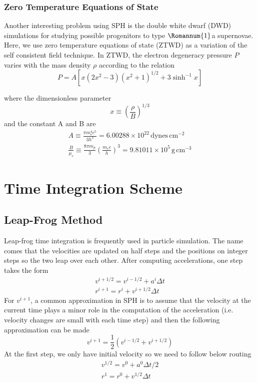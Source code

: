 \documentclass{article}
\begin{document}
\subsubsection{Zero Temperature Equations of State}
Another interesting problem using SPH is the double white dwarf (DWD) simulations for studying possible progenitors to type $\Romannum{1}$a supernovae. Here, we use zero temperature equations of state (ZTWD) as a variation of the self consistent field technique. In ZTWD, the electron degeneracy pressure $P$ varies with the mass density $\rho$ according to the relation
\begin{equation}
P = A \left[ x(2x^2-3)(x^2+1)^{1/2} + 3 \sinh^{-1} x \right]
\end{equation}

where the dimensionless parameter
\begin{equation}
x \equiv \left( \frac{\rho}{B} \right)^{1/3}
\end{equation}
and the constant A and B are
\begin{align}
A \equiv \frac{\pi m_e^4 c^5}{3h^3} = 6.00288 \times 10^{22} \, \text{dynes} \, \text{cm}^{-2} \\
\frac{B}{\mu_e} \equiv \frac{8 \pi m_p}{3} \left(\frac{m_e c}{h} \right)^3 = 9.81011 \times 10^5 \, \text{g} \, \text{cm}^{-3}
\end{align}

\section{Time Integration Scheme}
\subsection{Leap-Frog Method}
Leap-frog time integration is frequently used in particle simulation. The name comes that the velocities are updated on half steps and the positions on integer steps so the two leap over each other. After computing accelerations, one step takes the form
\begin{align}
v^{i+1/2} = v^{i-1/2} + a^i \Delta t \\
r^{i+1} = r^i + v^{i+1/2} \Delta t
\end{align}
For $v^{i+1}$, a common approximation in SPH is to assume that the velocity at the current time plays a minor role in the computation of the acceleration (i.e. velocity changes are small with each time step) and then the following approximation can be made
\begin{equation}
v^{i+1} = \frac{1}{2} (v^{i-1/2}+v^{i+1/2})
\end{equation}
At the first step, we only have initial velocity so we need to follow below routing
\begin{align}
v^{1/2} = v^{0} + a^0 \Delta t/2 \\
r^{1} = r^0 + v^{1/2} \Delta t
\end{align}
\end{document}
